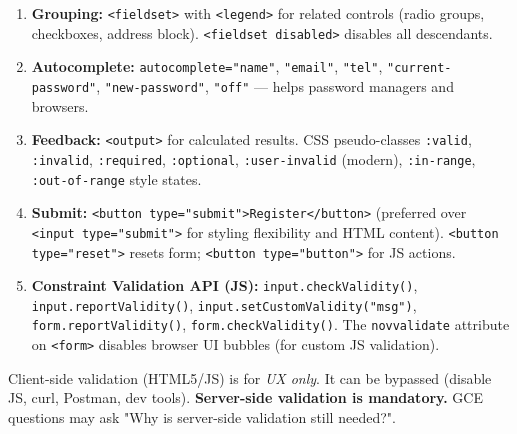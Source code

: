 \documentclass[11pt]{article}
\begin{document}
\begin{methode}
\begin{enumerate}
\begin{itemize}
            \item \texttt{title} — Tooltip hint for pattern (shown on validation error in some browsers).
            \item \texttt{accept} — File types for \texttt{<input type="file">} (e.g., \texttt{accept=".pdf,image/*"}).
            \item \texttt{multiple} — Allow multiple files/emails.
        \end{itemize}
    \item \textbf{Grouping:} \texttt{<fieldset>} with \texttt{<legend>} for related controls (radio groups, checkboxes, address block). \texttt{<fieldset disabled>} disables all descendants.
    \item \textbf{Autocomplete:} \texttt{autocomplete="name"}, \texttt{"email"}, \texttt{"tel"}, \texttt{"current-password"}, \texttt{"new-password"}, \texttt{"off"} — helps password managers and browsers.
    \item \textbf{Feedback:} \texttt{<output>} for calculated results. CSS pseudo-classes \texttt{:valid}, \texttt{:invalid}, \texttt{:required}, \texttt{:optional}, \texttt{:user-invalid} (modern), \texttt{:in-range}, \texttt{:out-of-range} style states.
    \item \textbf{Submit:} \texttt{<button type="submit">Register</button>} (preferred over \texttt{<input type="submit">} for styling flexibility and HTML content). \texttt{<button type="reset">} resets form; \texttt{<button type="button">} for JS actions.
    \item \textbf{Constraint Validation API (JS):} \texttt{input.checkValidity()}, \texttt{input.reportValidity()}, \texttt{input.setCustomValidity("msg")}, \texttt{form.reportValidity()}, \texttt{form.checkValidity()}. The \texttt{novvalidate} attribute on \texttt{<form>} disables browser UI bubbles (for custom JS validation).
\end{enumerate}
\begin{aretenir}
Client-side validation (HTML5/JS) is for \emph{UX only}. It can be bypassed (disable JS, curl, Postman, dev tools). \textbf{Server-side validation is mandatory.} GCE questions may ask "Why is server-side validation still needed?".
\end{aretenir}
\end{methode}
\end{document}
